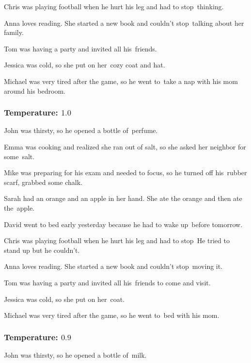 \documentclass[11pt]{article}
\begin{document}
    Chris was playing football when he hurt his leg and had to stop\textellipsis\ thinking.

    Anna loves reading. She started a new book and couldn't stop\textellipsis\ talking about her family.

    Tom was having a party and invited all his\textellipsis\ friends.

    Jessica was cold, so she put on her\textellipsis\ cozy coat and hat.

    Michael was very tired after the game, so he went to\textellipsis\ take a nap with his mom around his bedroom.

    \subsubsection*{Temperature: $1.0$}

    John was thirsty, so he opened a bottle of\textellipsis\ perfume.

    Emma was cooking and realized she ran out of salt, so she asked her neighbor for some\textellipsis\ salt.

    Mike was preparing for his exam and needed to focus, so he turned off his\textellipsis\ rubber scarf, grabbed some chalk.

    Sarah had an orange and an apple in her hand. She ate the orange and then ate the\textellipsis\ apple.

    David went to bed early yesterday because he had to wake up\textellipsis\ before tomorrow.

    Chris was playing football when he hurt his leg and had to stop\textellipsis\ He tried to stand up but he couldn't.

    Anna loves reading. She started a new book and couldn't stop\textellipsis\ moving it.

    Tom was having a party and invited all his\textellipsis\ friends to come and visit.

    Jessica was cold, so she put on her\textellipsis\ coat.

    Michael was very tired after the game, so he went to\textellipsis\ bed with his mom.

    \subsubsection*{Temperature: $0.9$}

    John was thirsty, so he opened a bottle of\textellipsis\ milk.
\end{document}
